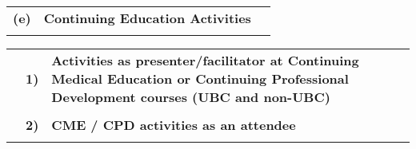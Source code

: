 \documentclass[11pt,notitlepage,english]{report}
\begin{document}
\begin{tabular}{L{.5cm} L{8cm} L{6.9cm}}
  \\
  \textbf{(e)} & \textbf{Continuing Education Activities} \\
  \\
\end{tabular}


\begin{tabular}{L{.5cm} L{.5cm} L{15cm}}
  \\
   & \textbf{1)} & \textbf{Activities as presenter/facilitator at Continuing Medical Education or Continuing Professional Development courses (UBC and non-UBC)}\\
   \\
   & \textbf{2)} & \textbf{CME / CPD activities as an attendee}\\
   \\
\end{tabular}
\end{document}
